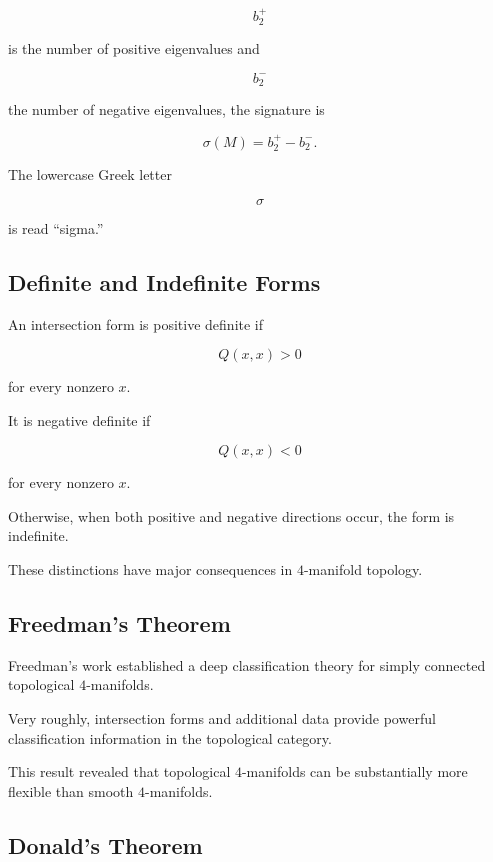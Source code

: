 \[
b_2^+
\]

is the number of positive eigenvalues and

\[
b_2^-
\]

the number of negative eigenvalues, the signature is

\[
\boxed{
\sigma(M)
=
b_2^+-b_2^-.
}
\]

The lowercase Greek letter

\[
\sigma
\]

is read ``sigma.''

\subsection{Definite and Indefinite Forms}
\label{subsec:definite-indefinite-forms}

An intersection form is positive definite if

\[
Q(x,x)>0
\]

for every nonzero \(x\).

It is negative definite if

\[
Q(x,x)<0
\]

for every nonzero \(x\).

Otherwise, when both positive and negative directions occur, the form is
indefinite.

These distinctions have major consequences in \(4\)-manifold topology.

\subsection{Freedman's Theorem}
\label{subsec:freedman-theorem}

Freedman's work established a deep classification theory for simply
connected topological \(4\)-manifolds.

Very roughly, intersection forms and additional data provide powerful
classification information in the topological category.

This result revealed that topological \(4\)-manifolds can be substantially
more flexible than smooth \(4\)-manifolds.

\subsection{Donald's Theorem}
\label{subsec:donaldson-theorem}

